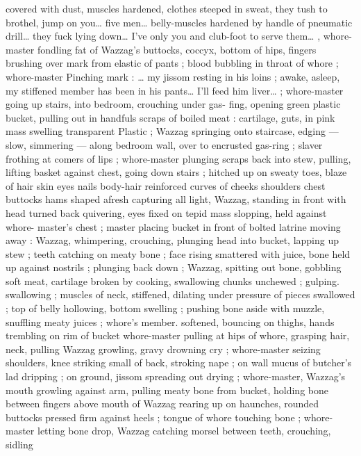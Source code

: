 covered with dust, muscles hardened, clothes steeped in sweat, they 
tush to brothel, jump on you{\ldots} five men{\ldots} belly-muscles hardened by 
handle of pneumatic drill{\ldots} they fuck lying down{\ldots} I've only you and 
club-foot to serve them{\ldots} {\gr}, whore-master fondling fat of Wazzag's 
buttocks, coccyx, bottom of hips, fingers brushing over mark from 
elastic of pants ; blood bubbling in throat of whore ; whore-master 
Pinching mark : {\gl} {\ldots} my jissom resting in his loins ; awake, asleep, my 
stiffened member has been in his pants{\ldots} I'll feed him liver{\ldots} {\gr} ; 
whore-master going up stairs, into bedroom, crouching under gas- 
fing, opening green plastic bucket, pulling out in handfuls scraps of 
boiled meat : cartilage, guts, in pink mass swelling transparent 
Plastic ; Wazzag springing onto staircase, edging --- slow, simmering 
--- along bedroom wall, over to encrusted gas-ring ; slaver frothing 
at comers of lips ; whore-master plunging scraps back into stew, 
pulling, lifting basket against chest, going down stairs ; hitched up 
on sweaty toes, blaze of hair skin eyes nails body-hair reinforced 
curves of cheeks shoulders chest buttocks hams shaped afresh 
capturing all light, Wazzag, standing in front with head turned back 
quivering, eyes fixed on tepid mass slopping, held against whore- 
master's chest ; master placing bucket in front of bolted latrine 
moving away : Wazzag, whimpering, crouching, plunging head into 
bucket, lapping up stew ; teeth catching on meaty bone ; face rising 
smattered with juice, bone held up against nostrils ; plunging back 
down ; Wazzag, spitting out bone, gobbling soft meat, cartilage 
broken by cooking, swallowing chunks unchewed ; gulping. 
swallowing ; muscles of neck, stiffened, dilating under pressure of 
pieces swallowed ; top of belly hollowing, bottom swelling ; pushing 
bone aside with muzzle, snuffling meaty juices ; whore's member. 
softened, bouncing on thighs, hands trembling on rim of bucket 
whore-master pulling at hips of whore, grasping hair, neck, pulling 
Wazzag growling, gravy drowning cry ; whore-master seizing 
shoulders, knee striking small of back, stroking nape ; on wall 
mucus of butcher's lad dripping ; on ground, jissom spreading out 
drying ; whore-master, Wazzag's mouth growling against arm, pulling 
meaty bone from bucket, holding bone between fingers above mouth 
of Wazzag rearing up on haunches, rounded buttocks pressed firm 
against heels ; tongue of whore touching bone ; whore-master letting 
bone drop, Wazzag catching morsel between teeth, crouching, sidling 
